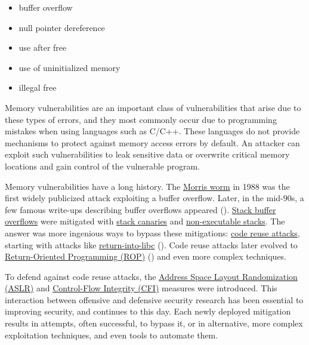 \documentclass[
  a4paper,
]{report}
\providecommand{\tightlist}{%
  \setlength{\itemsep}{0pt}\setlength{\parskip}{0pt}}
\begin{document}
\begin{itemize}
\tightlist
\item
  buffer overflow
\item
  null pointer dereference
\item
  use after free
\item
  use of uninitialized memory
\item
  illegal free
\end{itemize}

Memory vulnerabilities are an important class of vulnerabilities that
arise due to these types of errors, and they most commonly occur due to
programming mistakes when using languages such as
\label{__index_entry_1}{C}/\label{__index_entry_2}{C++}.
These languages do not provide mechanisms to protect against memory
access errors by default. An attacker can exploit such vulnerabilities
to leak sensitive data or overwrite critical memory locations and gain
control of the vulnerable program.

Memory vulnerabilities have a long history. The
\href{https://en.wikipedia.org/wiki/Morris_worm}{Morris worm} in 1988
was the first widely publicized attack exploiting a buffer overflow.
Later, in the mid-90s, a few famous write-ups describing buffer
overflows appeared ().
\hyperref[stack-buffer-overflows]{Stack buffer overflows} were mitigated
with \hyperref[stack-buffer-overflows]{stack canaries} and
\hyperref[stack-buffer-overflows]{non-executable stacks}. The answer was
more ingenious ways to bypass these mitigations:
\hyperref[code-reuse-attacks]{code reuse attacks}, starting with attacks
like \hyperref[code-reuse-attacks]{return-into-libc}
(). Code reuse attacks
later evolved to \hyperref[return-oriented-programming]{Return-Oriented
Programming (ROP)} () and even
more complex techniques.

To defend against code reuse attacks, the \hyperref[aslr]{Address Space
Layout Randomization (ASLR)} and
\hyperref[control-flow-integrity-cfi]{Control-Flow Integrity (CFI)}
measures were introduced. This interaction between offensive and
defensive security research has been essential to improving security,
and continues to this day. Each newly deployed mitigation results in
attempts, often successful, to bypass it, or in alternative, more
complex exploitation techniques, and even tools to automate them.
\end{document}
